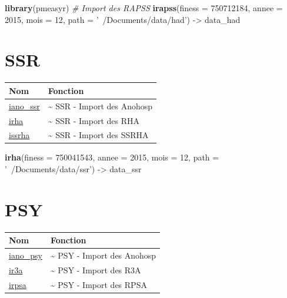 \documentclass[]{book}
\newenvironment{Shaded}{\begin{snugshade}}{\end{snugshade}}
\newcommand{\KeywordTok}[1]{\textcolor[rgb]{0.13,0.29,0.53}{\textbf{{#1}}}}
\newcommand{\DataTypeTok}[1]{\textcolor[rgb]{0.13,0.29,0.53}{{#1}}}
\newcommand{\DecValTok}[1]{\textcolor[rgb]{0.00,0.00,0.81}{{#1}}}
\newcommand{\StringTok}[1]{\textcolor[rgb]{0.31,0.60,0.02}{{#1}}}
\newcommand{\CommentTok}[1]{\textcolor[rgb]{0.56,0.35,0.01}{\textit{{#1}}}}
\newcommand{\NormalTok}[1]{{#1}}
\begin{document}
\begin{Shaded}
\begin{Highlighting}[]
\KeywordTok{library}\NormalTok{(pmeasyr)}
\CommentTok{# Import des RAPSS}
\KeywordTok{irapss}\NormalTok{(}\DataTypeTok{finess =} \DecValTok{750712184}\NormalTok{,}
       \DataTypeTok{annee =} \DecValTok{2015}\NormalTok{,}
       \DataTypeTok{mois =} \DecValTok{12}\NormalTok{,}
       \DataTypeTok{path =} \StringTok{'~/Documents/data/had'}\NormalTok{) ->}\StringTok{ }\NormalTok{data_had}
\end{Highlighting}
\end{Shaded}

\section{SSR}\label{ssr}

\begin{longtable}[]{@{}ll@{}}
\toprule
Nom & Fonction\tabularnewline
\midrule
\endhead
\href{https://github.com/IM-APHP/pmeasyr/tree/master/Rd_md/iano_ssr.Rmd}{iano\_ssr}
& \textasciitilde{} SSR - Import des Anohosp\tabularnewline
\href{https://github.com/IM-APHP/pmeasyr/tree/master/Rd_md/irha.Rmd}{irha}
& \textasciitilde{} SSR - Import des RHA\tabularnewline
\href{https://github.com/IM-APHP/pmeasyr/tree/master/Rd_md/issrha.Rmd}{issrha}
& \textasciitilde{} SSR - Import des SSRHA\tabularnewline
\bottomrule
\end{longtable}

\begin{Shaded}
\begin{Highlighting}[]
\KeywordTok{irha}\NormalTok{(}\DataTypeTok{finess =} \DecValTok{750041543}\NormalTok{,}
     \DataTypeTok{annee =} \DecValTok{2015}\NormalTok{,}
     \DataTypeTok{mois =} \DecValTok{12}\NormalTok{,}
     \DataTypeTok{path =} \StringTok{'~/Documents/data/ssr'}\NormalTok{) ->}\StringTok{ }\NormalTok{data_ssr}
\end{Highlighting}
\end{Shaded}

\section{PSY}\label{psy}

\begin{longtable}[]{@{}ll@{}}
\toprule
Nom & Fonction\tabularnewline
\midrule
\endhead
\href{https://github.com/IM-APHP/pmeasyr/tree/master/Rd_md/iano_psy.Rmd}{iano\_psy}
& \textasciitilde{} PSY - Import des Anohosp\tabularnewline
\href{https://github.com/IM-APHP/pmeasyr/tree/master/Rd_md/ir3a.Rmd}{ir3a}
& \textasciitilde{} PSY - Import des R3A\tabularnewline
\href{https://github.com/IM-APHP/pmeasyr/tree/master/Rd_md/irpsa.Rmd}{irpsa}
& \textasciitilde{} PSY - Import des RPSA\tabularnewline
\bottomrule
\end{longtable}
\end{document}
